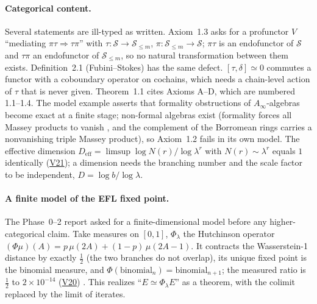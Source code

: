 \documentclass[11pt]{article}
\theoremstyle{definition}
\theoremstyle{remark}
\newcommand{\V}[1]{\hyperref[app:verify]{\textsf{#1}}}
\begin{document}
\paragraph{Categorical content.} Several statements are ill-typed as written. Axiom~1.3 asks for a profunctor $V$ ``mediating $\pi\tau\Rightarrow\tau\pi$'' with $\tau:\mathcal S\to\mathcal S_{\le m}$, $\pi:\mathcal S_{\le m}\to\mathcal S$; $\pi\tau$ is an endofunctor of $\mathcal S$ and $\tau\pi$ an endofunctor of $\mathcal S_{\le m}$, so no natural transformation between them exists. Definition~2.1 (Fubini--Stokes) has the same defect. $[\tau,\delta]\simeq0$ commutes a functor with a coboundary operator on cochains, which needs a chain-level action of $\tau$ that is never given. Theorem~1.1 cites Axioms A--D, which are numbered 1.1--1.4. The model example asserts that formality obstructions of $A_\infty$-algebras become exact at a finite stage; non-formal algebras exist (formality forces all Massey products to vanish \cite{DGMS1975}, and the complement of the Borromean rings carries a nonvanishing triple Massey product), so Axiom~1.2 fails in its own model. The effective dimension $D_{\mathrm{eff}}=\limsup\log N(r)/\log\lambda^r$ with $N(r)\sim\lambda^r$ equals $1$ identically (\V{V21}); a dimension needs the branching number and the scale factor to be independent, $D=\log b/\log\lambda$.

\paragraph{A finite model of the EFL fixed point.} The Phase~0--2 report asked for a finite-dimensional model before any higher-categorical claim. Take measures on $[0,1]$, $\Phi_\lambda$ the Hutchinson operator $(\Phi\mu)(A)=p\,\mu(2A)+(1-p)\,\mu(2A-1)$. It contracts the Wasserstein-1 distance by exactly $\tfrac12$ (the two branches do not overlap), its unique fixed point is the binomial measure, and $\Phi(\text{binomial}_n)=\text{binomial}_{n+1}$; the measured ratio is $\tfrac12$ to $2\times10^{-14}$ (\V{V20}) \cite{Hutchinson1981}. This realizes ``$E\simeq\Phi_\lambda E$'' as a theorem, with the colimit replaced by the limit of iterates.
\end{document}
